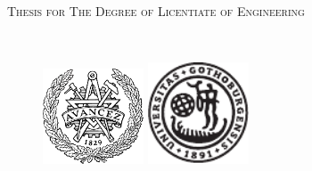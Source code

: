 \ifx\phdThesis\undefined
\newcommand{\degreetitle}{Licentiate of Engineering}
\newcommand{\reportno}{TODO}
\newcommand{\reportNoText}{Technical Report No \techReportNumber \\
 ISSN 1652-876X\\ }
\else
\newcommand{\degreetitle}{Doctor of Philosophy}
\newcommand{\reportNoText}{ISBN \phdISBNNumber\\
Doktorsavhandlingar vid Chalmers tekniska h\"{o}gskola, Ny serie nr \phdSeriesNumber .\\
ISSN 0346-718X\\ 
\vspace{1cm}

\noindent
Technical Report No \techReportNumber \\
}
\fi



\thispagestyle{empty} %
\begin{center}
  \textsc{Thesis for The Degree of \degreetitle}\\
\end{center}

\vspace{6cm}
\begin{center} \Large \mytitle
\end{center}

\vspace{1cm}
\begin{center}
\textsc{\authorname} \\
\end{center}

\vspace{2cm}
\begin{figure}[h]
  \begin{center}
     \includegraphics[width=30mm]{Fig/Avancez50PC.pdf}
     \hspace{1cm}
     \includegraphics[width=30mm]{Fig/GU_nu.pdf}
  \end{center}
\end{figure}
\vspace{2cm}

